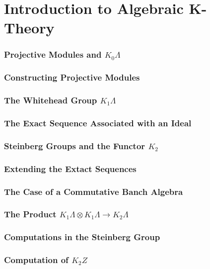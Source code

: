 \part{Introduction to Algebraic K-Theory}

\section{Projective Modules and $K_0\Lambda$}

\section{Constructing Projective Modules}

\section{The Whitehead Group $K_1\Lambda$}

\section{The Exact Sequence Associated with an Ideal}

\section{Steinberg Groups and the Functor $K_2$}

\section{Extending the Extact Sequences}

\section{The Case of a Commutative Banch Algebra}

\section{The Product $K_1 \Lambda \otimes K_1\Lambda \to K_2\Lambda$}

\section{Computations in the Steinberg Group}

\section{Computation of $K_2Z$}

